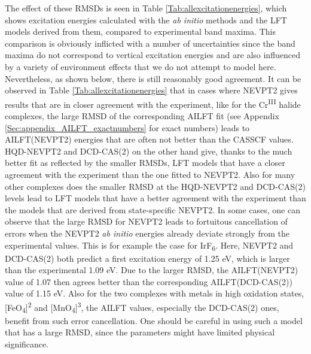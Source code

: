 The effect of these RMSDs is seen in Table \ref{Tab:allexcitationenergies}, which shows excitation energies calculated with the \textit{ab initio} methods and the LFT models derived from them, compared to experimental band maxima. This comparison is obviously inflicted with a number of uncertainties since the band maxima do not correspond to vertical excitation energies and are also influenced by a variety of environment effects that we do not attempt to model here. Nevertheless, as shown below, there is still reasonably good agreement. It can be observed in Table \ref{Tab:allexcitationenergies} that in cases where NEVPT2 gives results that are in closer agreement with the experiment, like for the Cr\textsuperscript{III} halide complexes, the large RMSD of the corresponding AILFT fit (see Appendix \ref{Sec:appendix_AILFT_exactnumbers} for exact numbers) leads to AILFT(NEVPT2) energies that are often not better than the CASSCF values. HQD-NEVPT2 and DCD-CAS(2) on the other hand give, thanks to the much better fit as reflected by the smaller RMSDs, LFT models that have a closer agreement with the experiment than the one fitted to NEVPT2. Also for many other complexes does the smaller RMSD at the HQD-NEVPT2 and DCD-CAS(2) levels lead to LFT models that have a better agreement with the experiment than the models that are derived from state-specific NEVPT2. In some cases, one can observe that the large RMSD for NEVPT2 leads to fortuitous cancellation of errors when the NEVPT2 \textit{ab initio} energies already deviate strongly from the experimental values. This is for example the case for IrF\textsubscript{6}. Here, NEVPT2 and DCD-CAS(2) both predict a first excitation energy of 1.25 eV, which is larger than the experimental 1.09 eV. Due to the larger RMSD, the AILFT(NEVPT2) value of 1.07 then agrees better than the corresponding AILFT(DCD-CAS(2)) value of 1.15 eV. Also for the two complexes with metals in high oxidation states, [FeO\textsubscript{4}]\textsuperscript{2\textminus} and [MnO\textsubscript{4}]\textsuperscript{3\textminus}, the AILFT values, especially the DCD-CAS(2) ones, benefit from such error cancellation. One should be careful in using such a model that has a large RMSD, since the parameters might have limited physical significance.



